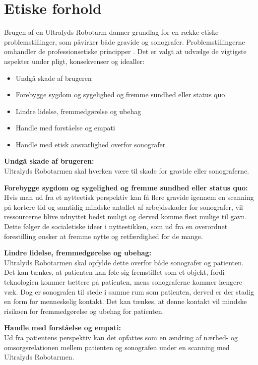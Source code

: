 \section{Etiske forhold}
Brugen af en Ultralyds Robotarm danner grundlag for en række etiske problemstillinger, som påvirker både gravide og sonografer. 
Problemstillingerne omhandler de professionsetiske principper \cite{Husted}. Det er valgt at udvælge de vigtigste aspekter under pligt, konsekvenser og idealler: 
\begin{itemize}
		\item Undgå skade af brugeren
		\item Forebygge sygdom og sygelighed og fremme sundhed eller status quo
		\item Lindre lidelse, fremmedgørelse og ubehag
		\item Handle med forståelse og empati
		\item Handle med etisk ansvarlighed overfor sonografer 
\end{itemize} 

\textbf{Undgå skade af brugeren:} \\
Ultralyds Robotarmen skal hverken være til skade for gravide eller sonograferne.

\textbf{Forebygge sygdom og sygelighed og fremme sundhed eller status quo:} \\
Hvis man ud fra et nytteetisk perspektiv kan få flere gravide igennem en scanning på kortere tid og samtidig mindske antallet af arbejdsskader for sonografer, vil ressourcerne blive udnyttet bedst muligt og derved komme flest mulige til gavn. Dette følger de socialetiske ideer i nytteetikken, som ud fra en overordnet forestilling ønsker at fremme nytte og retfærdighed for de mange.
    
\textbf{Lindre lidelse, fremmedgørelse og ubehag:}\\
Ultralyds Robotarmen skal opfylde dette overfor både sonografer og patienten. Det kan tænkes, at patienten kan føle sig fremstillet som et objekt, fordi teknologien kommer tættere på patienten, mens sonograferne kommer længere væk. Dog er sonografen til stede i samme rum som patienten, derved er der stadig en form for menneskelig kontakt. Det kan tænkes, at denne kontakt vil mindske risikoen for fremmedgørelse og ubehag for patienten.   

\textbf{Handle med forståelse og empati:}\\
Ud fra patientens perspektiv kan det opfattes som en ændring af nærhed- og omsorgsrelationen mellem patienten og sonografen under en scanning med Ultralyds Robotarmen. 

